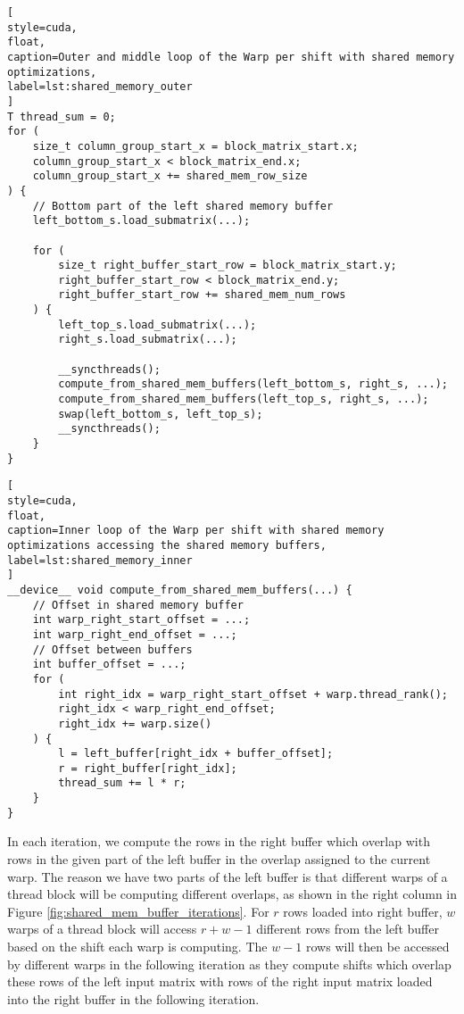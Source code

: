 \begin{lstlisting}[
style=cuda,
float,
caption=Outer and middle loop of the Warp per shift with shared memory optimizations,
label=lst:shared_memory_outer
]
T thread_sum = 0;
for (
	size_t column_group_start_x = block_matrix_start.x;
	column_group_start_x < block_matrix_end.x;
	column_group_start_x += shared_mem_row_size
) {
	// Bottom part of the left shared memory buffer
	left_bottom_s.load_submatrix(...);
	
	for (
		size_t right_buffer_start_row = block_matrix_start.y;
		right_buffer_start_row < block_matrix_end.y;
		right_buffer_start_row += shared_mem_num_rows
	) {
		left_top_s.load_submatrix(...);
		right_s.load_submatrix(...);
		
		__syncthreads();
		compute_from_shared_mem_buffers(left_bottom_s, right_s, ...);
		compute_from_shared_mem_buffers(left_top_s, right_s, ...);
		swap(left_bottom_s, left_top_s);
		__syncthreads();
	}
}
\end{lstlisting}


\begin{lstlisting}[
style=cuda,
float,
caption=Inner loop of the Warp per shift with shared memory optimizations accessing the shared memory buffers,
label=lst:shared_memory_inner
]
__device__ void compute_from_shared_mem_buffers(...) {
	// Offset in shared memory buffer
	int warp_right_start_offset = ...;
	int warp_right_end_offset = ...;
	// Offset between buffers
	int buffer_offset = ...;
	for (
		int right_idx = warp_right_start_offset + warp.thread_rank();
		right_idx < warp_right_end_offset;
		right_idx += warp.size()
	) {
		l = left_buffer[right_idx + buffer_offset];
		r = right_buffer[right_idx];
		thread_sum += l * r; 
	}
}
\end{lstlisting}

In each iteration, we compute the rows in the right buffer which overlap with rows in the given part of the left buffer in the overlap assigned to the current warp. The reason we have two parts of the left buffer is that different warps of a thread block will be computing different overlaps, as shown in the right column in Figure \ref{fig:shared_mem_buffer_iterations}. For $r$ rows loaded into right buffer, $w$ warps of a thread block will access $r + w - 1$ different rows from the left buffer based on the shift each warp is computing. The $w - 1$ rows will then be accessed by different warps in the following iteration as they compute shifts which overlap these rows of the left input matrix with rows of the right input matrix loaded into the right buffer in the following iteration. 




